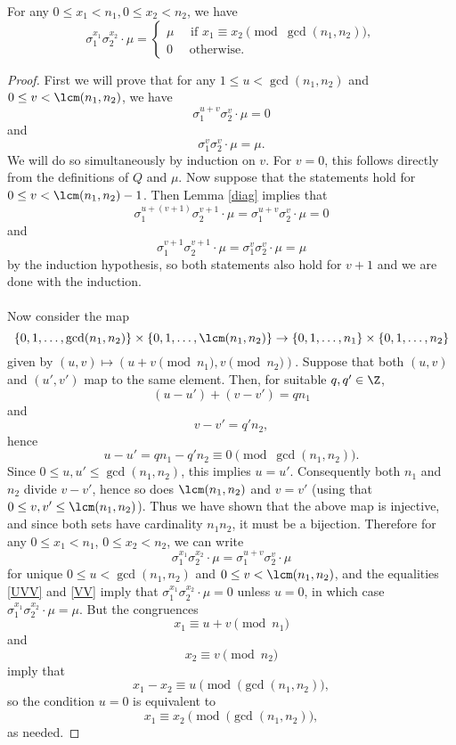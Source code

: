 \begin{lemma}\label{M0}
For any $0\leq x_1<n_1, 0\leq x_2<n_2$, we have $$\sigma_1^{x_1}\sigma_2^{x_2}\cdot \mu=\begin{cases}
\mu \quad \text{ if } x_1\equiv x_2 \pmod{\gcd(n_1,n_2)},\\
0 \quad \text{ otherwise}.
\end{cases}$$
\end{lemma}
\begin{proof}
First we will prove that for any $1\leq u<\gcd(n_1,n_2)$ and $0\leq v<\lcm(n_1,n_2)$, we have 
\begin{equation}\label{UVV}
\sigma_1^{u+v}\sigma_2^{v}\cdot \mu=0
\end{equation}
and
\begin{equation}\label{VV}
\sigma_1^{v}\sigma_2^{v}\cdot \mu=\mu.
\end{equation}
We will do so simultaneously by induction on $v$. For $v=0$, this follows directly from the definitions of $Q$ and $\mu$. Now suppose that the statements hold for $0\leq v<\lcm(n_1,n_2)-1$. Then Lemma \ref{diag} implies that $$\sigma_1^{u+(v+1)}\sigma_2^{v+1}\cdot \mu=\sigma_1^{u+v}\sigma_2^{v}\cdot \mu=0$$
and $$\sigma_1^{v+1}\sigma_2^{v+1}\cdot \mu=\sigma_1^{v}\sigma_2^{v}\cdot \mu=\mu$$
by the induction hypothesis, so both statements also hold for $v+1$ and we are done with the induction.

\paragraph*{}
Now consider the map $$\{0,1,\dots,\gcd(n_1,n_2)\}\times \{0,1,\dots,\lcm(n_1,n_2)\} \to \{0,1,\dots,n_1\}\times \{0,1,\dots,n_2\}$$
given by $(u,v)\mapsto (u+v\pmod{n_1},v \pmod{n_2})$. Suppose that both $(u,v)$ and $(u',v')$ map to the same element. Then, for suitable $q, q' \in \Z$, $$(u-u')+(v-v')=qn_1$$ and $$v-v'=q'n_2,$$ hence $$u-u'=qn_1-q'n_2\equiv 0 \pmod {\gcd(n_1,n_2)}.$$ Since $0\le u,u'\le \gcd(n_1,n_2)$, this implies $u=u'$. Consequently both $n_1$ and $n_2$ divide $v-v'$, hence so does $\lcm(n_1,n_2)$ and $v=v'$ (using that $0\le v,v'\le \lcm(n_1,n_2)$). Thus we have shown that the above map is injective, and since both sets have cardinality $n_1n_2$, it must be a bijection. Therefore for any $0\leq x_1<n_1$, $0\leq x_2<n_2$, we can write $$\sigma_1^{x_1}\sigma_2^{x_2}\cdot \mu=\sigma_1^{u+v}\sigma_2^{v}\cdot \mu$$
for unique $0\leq u<\gcd(n_1,n_2)$ and $0\leq v<\lcm(n_1,n_2)$, and the equalities \eqref{UVV} and \eqref{VV} imply that $\sigma_1^{x_1}\sigma_2^{x_2}\cdot \mu=0$ unless $u=0$, in which case $\sigma_1^{x_1}\sigma_2^{x_2}\cdot \mu=\mu$. But the congruences $$x_1\equiv u+v \pmod{n_1}$$ and $$x_2\equiv v \pmod{n_2}$$ imply that $$x_1-x_2\equiv u  \pmod{(\gcd(n_1,n_2)},$$
so the condition $u=0$ is equivalent to $$x_1\equiv x_2 \pmod{(\gcd(n_1,n_2)},$$ as needed.


\end{proof}
